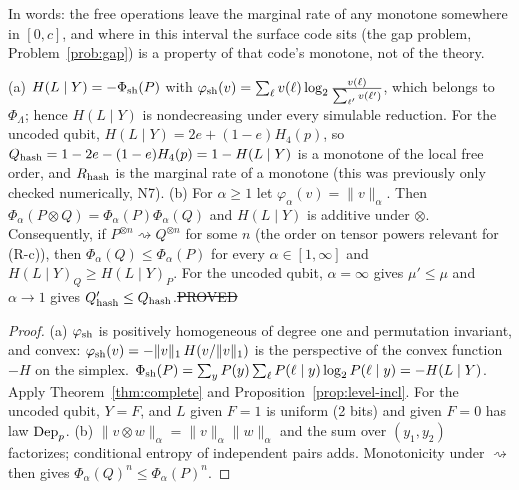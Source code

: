 \noindent In words: the free operations leave the marginal rate of any monotone somewhere in $[0,c]$, and where in this interval the surface code sits (the gap problem, Problem~\ref{prob:gap}) is a property of that code's monotone, not of the theory.

\begin{proposition}\label{prop:hash}
(a) $H(L\mid Y)=-\Phi_{\rm sh}(P)$ with $\varphi_{\rm sh}(v)=\sum_\ell v(\ell)\log_2\frac{v(\ell)}{\sum_{\ell'}v(\ell')}$, which belongs to $\Phi_\Lambda$; hence $H(L\mid Y)$ is nondecreasing under every simulable reduction. For the uncoded qubit, $H(L\mid Y)=2e+(1-e)H_4(p)$, so $Q_{\rm hash}=1-2e-(1-e)H_4(p)=1-H(L\mid Y)$ is a monotone of the local free order, and $R_{\rm hash}$ is the marginal rate of a monotone (this was previously only checked numerically, N7).
(b) For $\alpha\ge1$ let $\varphi_\alpha(v)=\|v\|_\alpha$. Then $\Phi_\alpha(P\otimes Q)=\Phi_\alpha(P)\Phi_\alpha(Q)$ and $H(L\mid Y)$ is additive under $\otimes$. Consequently, if $P^{\otimes n}\rightsquigarrow Q^{\otimes n}$ for some $n$ (the order on tensor powers relevant for (R-c)), then $\Phi_\alpha(Q)\le\Phi_\alpha(P)$ for every $\alpha\in[1,\infty]$ and $H(L\mid Y)_Q\ge H(L\mid Y)_P$. For the uncoded qubit, $\alpha=\infty$ gives $\mu'\le\mu$ and $\alpha\to1$ gives $Q_{\rm hash}'\le Q_{\rm hash}$.\hfill\st{PROVED}
\end{proposition}
\begin{proof}
(a) $\varphi_{\rm sh}$ is positively homogeneous of degree one and permutation invariant, and convex: $\varphi_{\rm sh}(v)=-\|v\|_1\,H(v/\|v\|_1)$ is the perspective of the convex function $-H$ on the simplex. $\Phi_{\rm sh}(P)=\sum_yP(y)\sum_\ell P(\ell\mid y)\log_2P(\ell\mid y)=-H(L\mid Y)$. Apply Theorem~\ref{thm:complete} and Proposition~\ref{prop:level-incl}. For the uncoded qubit, $Y=F$, and $L$ given $F=1$ is uniform (2 bits) and given $F=0$ has law $\mathrm{Dep}_p$.
(b) $\|v\otimes w\|_\alpha=\|v\|_\alpha\|w\|_\alpha$ and the sum over $(y_1,y_2)$ factorizes; conditional entropy of independent pairs adds. Monotonicity under $\rightsquigarrow$ then gives $\Phi_\alpha(Q)^n\le\Phi_\alpha(P)^n$.
\end{proof}

